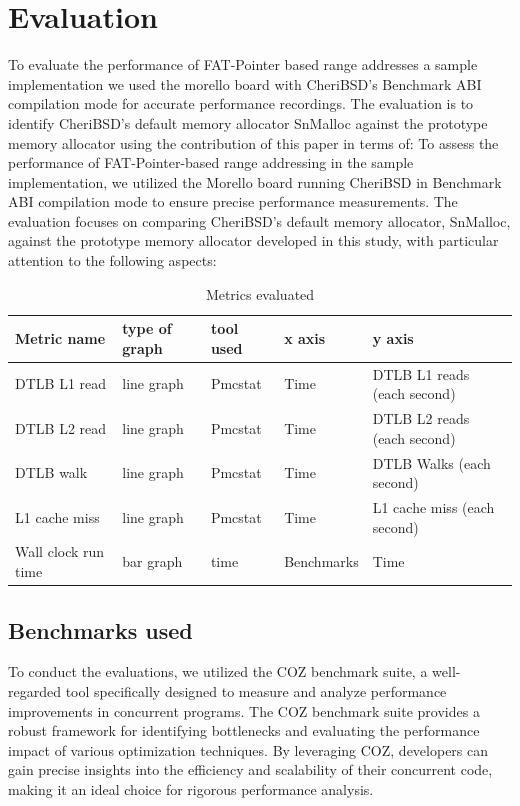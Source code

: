\chapter{Evaluation}\label{chap:evaluation}
\ifpdf
    \graphicspath{{Evaluation/Figs/Raster/}{Evaluation/Figs/PDF/}{Evaluation/Figs/}}
\else
    \graphicspath{{Evaluation/Figs/Vector/}{Evaluation/Figs/}}
\fi

To evaluate the performance of FAT-Pointer based range addresses a sample implementation we used
the morello board with CheriBSD's Benchmark ABI\cite{noauthor_benchmark_nodate} compilation mode for accurate performance recordings. 
The evaluation is to identify CheriBSD's default memory allocator SnMalloc against the prototype memory 
allocator using the contribution of this paper in terms of: 
To assess the performance of FAT-Pointer-based range addressing in the sample implementation, we utilized the 
Morello board running CheriBSD in Benchmark ABI compilation mode to ensure precise performance measurements. 
The evaluation focuses on comparing CheriBSD's default memory allocator, SnMalloc, against the prototype 
memory allocator developed in this study, with particular attention to the following aspects:

\begin{table}[!ht]
  \centering
  \begin{tabular}{|l|l|l|l|l|}
  \hline
      Metric name & type of graph & tool used & x axis & y axis \\ \hline
      DTLB L1 read & line graph & Pmcstat & Time & DTLB L1 reads (each second) \\ \hline
      DTLB L2 read & line graph & Pmcstat & Time & DTLB L2 reads (each second) \\ \hline
      DTLB walk & line graph & Pmcstat & Time & DTLB Walks (each second) \\ \hline
      L1 cache miss & line graph & Pmcstat & Time & L1 cache miss (each second) \\ \hline
      Wall clock run time & bar graph & time & Benchmarks & Time \\ \hline
  \end{tabular}
  \caption{Metrics evaluated}
\end{table}

\section{Benchmarks used}
To conduct the evaluations, we utilized the COZ\cite{curtsinger_coz_2015} benchmark suite, a well-regarded tool specifically designed 
to measure and analyze performance improvements in concurrent programs. The COZ benchmark suite provides a
robust framework for identifying bottlenecks and evaluating the performance impact of various optimization
techniques. By leveraging COZ, developers can gain precise insights into the efficiency and scalability of
their concurrent code, making it an ideal choice for rigorous performance analysis.

